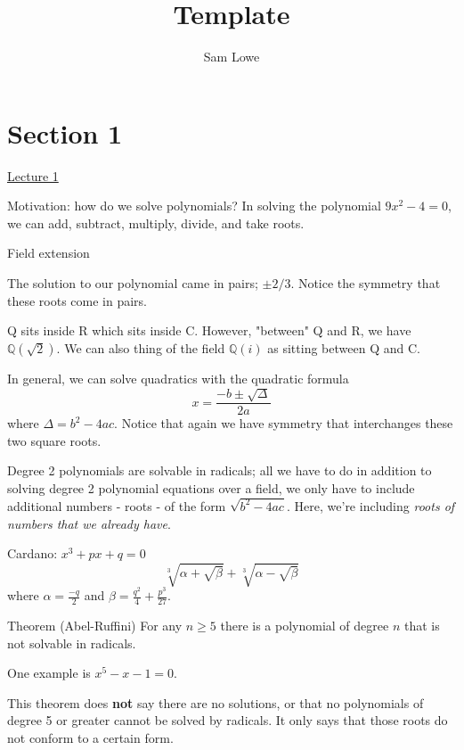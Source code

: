 \documentclass[12pt]{article}
\title{Template}
\author{Sam Lowe}
\newcommand{\Q}{\ensuremath{\mathbb{Q}}}
\begin{document}
\maketitle

\tableofcontents

\pagebreak

\section{Section 1}

\underline{Lecture 1}

Motivation: how do we solve polynomials? In solving the polynomial $9x^2 - 4 = 0$, we can add, subtract, multiply, divide, and take roots.

Field extension

The solution to our polynomial came in pairs; $\pm 2/3$. Notice the symmetry that these roots come in pairs.

Q sits inside R which sits inside C. However, "between" Q and R, we have $\Q(\sqrt{2})$. We can also thing of the field $\Q(i)$ as sitting between Q and C.

In general, we can solve quadratics with the quadratic formula $$x = \frac{-b \pm \sqrt{\Delta}}{2a}$$ where $\Delta = b^2 - 4ac$. Notice that again we have symmetry that interchanges these two square roots.

Degree 2 polynomials are solvable in radicals; all we have to do in addition to solving degree 2 polynomial equations over a field, we only have to include additional numbers - roots - of the form $\sqrt{b^2 - 4ac}$. Here, we're including \textit{roots of numbers that we already have}.

Cardano: $x^3 + px + q = 0$ $$\sqrt[3]{\alpha + \sqrt{\beta}} + \sqrt[3]{\alpha - \sqrt{\beta}}$$ where $\alpha = \frac{-q}{2}$ and $\beta = \frac{q^2}{4} + \frac{p^3}{27}$.

Theorem (Abel-Ruffini) For any $n \geq 5$ there is a polynomial of degree $n$ that is not solvable in radicals.

One example is $x^5 - x - 1 = 0$.

This theorem does \textbf{not} say there are no solutions, or that no polynomials of degree 5 or greater cannot be solved by radicals. It only says that those roots do not conform to a certain form.
\end{document}
